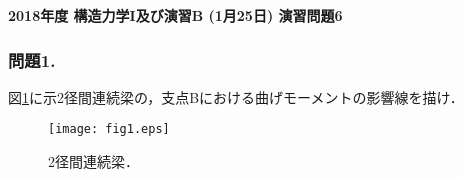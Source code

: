 \documentclass[10pt,a4j]{jarticle}
\newlength{\minitwocolumn}
\begin{document}
\newcommand{\fat}[1]{\mbox{\boldmath $#1$}}
\newcommand{\D}{\partial}
\newcommand{\w}{\omega}
\newcommand{\ga}{\alpha}
\newcommand{\gb}{\beta}
\newcommand{\gx}{\xi}
\newcommand{\gz}{\zeta}
\newcommand{\vhat}[1]{\hat{\fat{#1}}}
\newcommand{\spc}{\vspace{0.7\baselineskip}}
\newcommand{\halfspc}{\vspace{0.3\baselineskip}}

\pagestyle{empty}
\newcommand{\twofig}[2]
 {
   \begin{figure}[h]
     \begin{minipage}[t]{\minitwocolumn}
         \begin{center}   #1
         \end{center}
     \end{minipage}
         \hspace{\columnsep}
     \begin{minipage}[t]{\minitwocolumn}
         \begin{center} #2
         \end{center}
     \end{minipage}
   \end{figure}
 }
\begin{center}
{\Large \bf 2018年度 構造力学I及び演習B (1月25日) 演習問題6} \\
\end{center}
\subsubsection*{問題1.}
図\ref{fig:fig1}に示2径間連続梁の，支点Bにおける曲げモーメントの影響線を描け．
\begin{figure}[h]
	\begin{center}
	\texttt{[image: fig1.eps]} 
	\end{center}
	\caption{2径間連続梁．} 
	\label{fig:fig1}
\end{figure}
%
\end{document}
